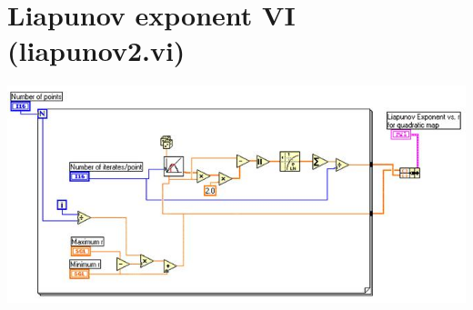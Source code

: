 \documentclass{../lab}
\begin{document}
\section{Liapunov exponent VI (liapunov2.vi)}

\begin{center}
    \href{http://experimentationlab.berkeley.edu/sites/default/files/images/Nldimage142.jpg}{\includegraphics[width=\linewidth]{images/Nldimage142.jpg}}
\end{center}
\end{document}
